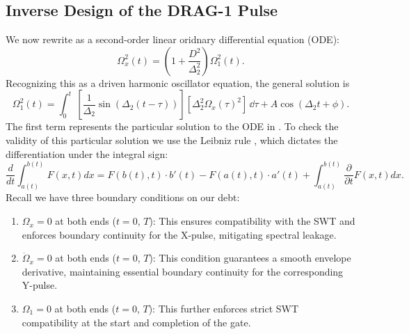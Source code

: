 \subsection{Inverse Design of the DRAG-1 Pulse}
We now rewrite   as a second-order linear oridnary differential equation (ODE):
\begin{equation}
  \Omega^2_x(t)=\left(1+\frac{D^2}{\Delta_2^2}\right)\Omega_1^2(t).
  \label{eq:drag1_ode}
\end{equation}
Recognizing this as a driven harmonic oscillator equation, the general solution is
\begin{equation}
  \Omega_1^2(t) = \int_0^t\,\left[\dfrac{1}{\Delta_2}\sin(\Delta_2(t-\tau))\right][\Delta_2^2\Omega_x(\tau)^2]\,\dd \tau
  + A\cos(\Delta_2t+\phi).
  \label{eq:drag1_sol}
\end{equation}
The first term represents the particular solution to the ODE in .
To check the validity of this particular solution we use the Leibniz rule \cite{apostol}, which dictates the differentiation under the integral sign:
\begin{equation}
  \frac{d}{dt} \int_{a(t)}^{b(t)} F(x,t) dx = F(b(t), t) \cdot b'(t) - F(a(t), t) \cdot a'(t) + \int_{a(t)}^{b(t)} \frac{\partial}{\partial t} F(x,t) dx.
  \label{eq:leibniz}
\end{equation}
Recall we have three boundary conditions on our debt:
\begin{enumerate}
  \item $\Omega_x = 0$ at both ends ($t=0$, $T$): This ensures compatibility with the SWT and enforces boundary continuity for the X-pulse, mitigating spectral leakage.
  \item $\dot{\Omega}_x = 0$ at both ends ($t=0$, $T$): This condition guarantees a smooth envelope derivative, maintaining essential boundary continuity for the corresponding Y-pulse.
  \item $\Omega_1 = 0$ at both ends ($t=0$, $T$): This further enforces strict SWT compatibility at the start and completion of the gate.
\end{enumerate}

